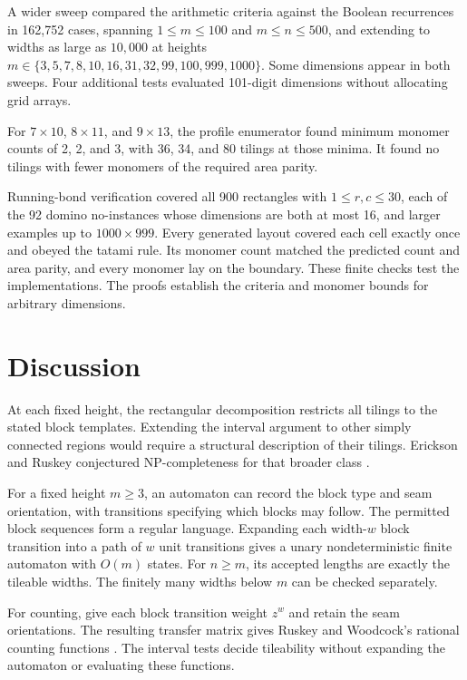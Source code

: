 \documentclass[11pt, reqno]{amsart}
\theoremstyle{definition}
\theoremstyle{remark}
\numberwithin{equation}{section}
\begin{document}
A wider sweep compared the arithmetic criteria against the Boolean
recurrences in 162{,}752 cases, spanning $1\le m\le100$ and
$m\le n\le500$, and extending to widths as large as $10{,}000$ at
heights $m\in\{3,\allowbreak 5,\allowbreak 7,\allowbreak 8,\allowbreak
    10,\allowbreak 16,\allowbreak 31,\allowbreak 32,\allowbreak
    99,\allowbreak 100,\allowbreak 999,\allowbreak 1000\}$.
Some dimensions appear in both sweeps. Four additional tests evaluated
101-digit dimensions without allocating grid arrays.

For $7\times10$, $8\times11$, and $9\times13$, the profile enumerator
found minimum monomer counts of 2, 2, and 3, with 36, 34, and 80 tilings
at those minima. It found no tilings with fewer monomers of the
required area parity.

Running-bond verification covered all 900 rectangles with
$1\le r,c\le30$, each of the 92 domino no-instances whose dimensions
are both at most 16, and larger examples up to $1000\times999$. Every
generated layout covered each cell exactly once and obeyed the tatami
rule. Its monomer count matched the predicted count and area parity,
and every monomer lay on the boundary. These finite checks test the
implementations. The proofs establish the criteria and monomer bounds
for arbitrary dimensions.

\section{Discussion}
\label{sec:discussion}

At each fixed height, the rectangular decomposition restricts all
tilings to the stated block templates. Extending the interval argument
to other simply connected regions would require a structural description
of their tilings. Erickson and Ruskey conjectured NP-completeness for
that broader class \cite{er13}.

For a fixed height $m\ge3$, an automaton can record the block type and
seam orientation, with transitions specifying which blocks may follow.
The permitted block sequences form a regular language. Expanding each
width-$w$ block transition into a path of $w$ unit transitions gives a
unary nondeterministic finite automaton with $O(m)$ states. For
$n\ge m$, its accepted lengths are exactly the tileable widths.
The finitely many widths below $m$ can be checked separately.

For counting, give each block transition weight $z^w$ and retain the
seam orientations. The resulting transfer matrix gives Ruskey and
Woodcock's rational counting functions \cite{ruskey}. The interval
tests decide tileability without expanding the automaton or evaluating
these functions.
\end{document}
